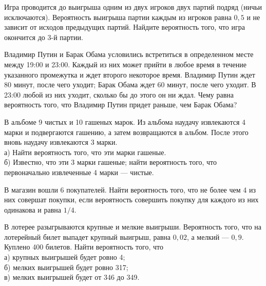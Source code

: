 \newpage\setcounter{zad}{0}



\begin{zkrW}{20}\noindent 
	Игра проводится до выигрыша одним из двух игроков двух партий подряд (ничьи исключаются). Вероятность выигрыша партии каждым из игроков равна $0{,}5$ и не зависит от исходов предыдущих партий. Найдите вероятность того, что игра окончится до 3-й партии.
 
\end{zkrW}

\begin{zkrW}{20}\noindent 
	Владимир Путин и Барак Обама условились встретиться в определенном месте между 19:00 и 23:00. Каждый из них может прийти в любое время в течение указанного промежутка и ждет второго некоторое время. Владимир Путин ждет 80 минут, после чего уходит; Барак Обама ждет 60 минут, после чего уходит. В 23:00 любой из них уходит, сколько бы до этого он ни ждал. Чему равна вероятность того, что Владимир Путин придет раньше, чем Барак Обама?
 
\end{zkrW}

\begin{zkrW}{20}\noindent 
	В альбоме 9 чистых и 10 гашеных марок. Из альбома наудачу извлекаются 4 марки и подвергаются гашению, а затем возвращаются в альбом. После этого вновь наудачу извлекаются 3 марки. \\ \indent а) Найти вероятность того, что эти марки гашеные. \\ \indent б) Известно, что эти 3 марки гашеные; найти вероятность того, что первоначально извлеченные 4 марки --- чистые.
 
\end{zkrW}

\begin{zkrW}{20}\noindent 
	В магазин вошли 6 покупателей. Найти вероятность того, что не более чем 4 из них совершат покупки, если вероятность совершить покупку для каждого из них одинакова и равна $1/4$.
 
\end{zkrW}

\begin{zkrW}{20}\noindent 
	В лотерее разыгрываются крупные и мелкие выигрыши. Вероятность того, что на лотерейный билет выпадет крупный выигрыш, равна $0{,}02$, а мелкий --- $0{,}9$. Куплено 400 билетов. Найти вероятность того, что \\ \indent а) крупных выигрышей будет ровно 4; \\ \indent б) мелких выигрышей будет ровно 317; \\ \indent в) мелких выигрышей будет от 346 до 349.
 
\end{zkrW}

